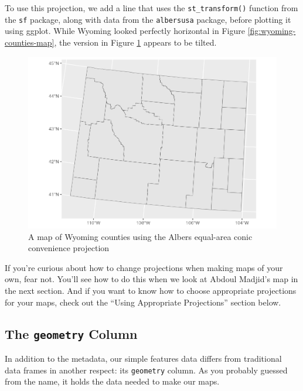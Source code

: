 \documentclass[
]{book}
\begin{document}
To use this projection, we add a line that uses the \texttt{st\_transform()} function from the \texttt{sf} package, along with data from the \texttt{albersusa} package, before plotting it using ggplot. While Wyoming looked perfectly horizontal in Figure \ref{fig:wyoming-counties-map}, the version in Figure \ref{fig:wyoming-counties-map-wgs84} appears to be tilted.

\begin{figure}
\includegraphics[width=1\linewidth]{maps_files/figure-latex/wyoming-counties-map-wgs84-1} \caption{A map of Wyoming counties using the Albers equal-area conic convenience projection}\label{fig:wyoming-counties-map-wgs84}
\end{figure}

If you're curious about how to change projections when making maps of your own, fear not. You'll see how to do this when we look at Abdoul Madjid's map in the next section. And if you want to know how to choose appropriate projections for your maps, check out the ``Using Appropriate Projections'' section below.

\hypertarget{the-geometry-column}{%
\subsection*{\texorpdfstring{The \texttt{geometry} Column}{The geometry Column}}\label{the-geometry-column}}

In addition to the metadata, our simple features data differs from traditional data frames in another respect: its \texttt{geometry} column. As you probably guessed from the name, it holds the data needed to make our maps.
\end{document}
